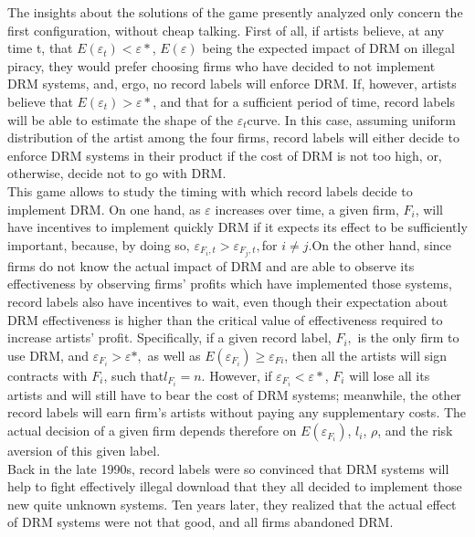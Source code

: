 \documentclass[letter,12pt]{article}
\numberwithin{equation}{section}
\begin{document}
The insights about the solutions of the game presently analyzed only
concern the first configuration, without cheap talking. First of all,
if artists believe, at any time t, that $E(\varepsilon_{t})<\varepsilon*$,
$E(\varepsilon)$ being the expected impact of DRM on illegal piracy,
they would prefer choosing firms who have decided to not implement
DRM systems, and, ergo, no record labels will enforce DRM. If, however,
artists believe that $E(\varepsilon_{t})>\varepsilon*$, and that
for a sufficient period of time, record labels will be able to estimate
the shape of the $\varepsilon_{t}$curve. In this case, assuming uniform
distribution of the artist among the four firms, record labels will
either decide to enforce DRM systems in their product if the cost
of DRM is not too high, or, otherwise, decide not to go with DRM.\\

This game allows to study the timing with which record labels decide
to implement DRM. On one hand, as $\varepsilon$ increases over time,
a given firm, $F_{i}$, will have incentives to implement quickly
DRM if it expects its effect to be sufficiently important, because,
by doing so, $\varepsilon_{F_{i},t}>\varepsilon_{F_{j},t},$for $i\neq j.$On
the other hand, since firms do not know the actual impact of DRM and
are able to observe its effectiveness by observing firms' profits
which have implemented those systems, record labels also have incentives
to wait, even though their expectation about DRM effectiveness is
higher than the critical value of effectiveness required to increase
artists' profit. Specifically, if a given record label, $F_{i},$
is the only firm to use DRM, and $\varepsilon_{F_{i}}>\varepsilon*,$
as well as $E(\varepsilon_{F_{i}})\geq\varepsilon_{Fi}$, then all
the artists will sign contracts with $F_{i}$, such that$l_{F_{i}}=n$.
However, if $\varepsilon_{F_{i}}<\varepsilon*$, $F_{i}$ will lose
all its artists and will still have to bear the cost of DRM systems;
meanwhile, the other record labels will earn firm's artists without
paying any supplementary costs. The actual decision of a given firm
depends therefore on $E(\varepsilon_{F_{i}})$, $l_{i}$, $\rho$,
and the risk aversion of this given label.\\

Back in the late 1990s, record labels were so convinced that DRM systems
will help to fight effectively illegal download that they all decided
to implement those new quite unknown systems. Ten years later, they
realized that the actual effect of DRM systems were not that good,
and all firms abandoned DRM.
\end{document}
